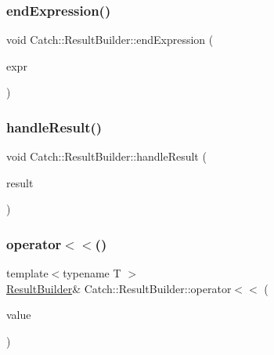 \mbox{\label{class_catch_1_1_result_builder_a864e03b7300271de7cc44b9864463c5a}} 
\subsubsection{\texorpdfstring{end\+Expression()}{endExpression()}}
{\footnotesize\ttfamily void Catch\+::\+Result\+Builder\+::end\+Expression (\begin{DoxyParamCaption}\item[{\mbox{\hyperlink{struct_catch_1_1_decomposed_expression}{Decomposed\+Expression}} const \&}]{expr }\end{DoxyParamCaption})}

\mbox{\label{class_catch_1_1_result_builder_ad8bb17e4ac590b75bf8630d8f3502f4e}} 
\subsubsection{\texorpdfstring{handle\+Result()}{handleResult()}}
{\footnotesize\ttfamily void Catch\+::\+Result\+Builder\+::handle\+Result (\begin{DoxyParamCaption}\item[{\mbox{\hyperlink{class_catch_1_1_assertion_result}{Assertion\+Result}} const \&}]{result }\end{DoxyParamCaption})}

\mbox{\label{class_catch_1_1_result_builder_a5aa79ce6160ab8cd800eb65bbd7a28a4}} 
\subsubsection{\texorpdfstring{operator$<$$<$()}{operator<<()}}
{\footnotesize\ttfamily template$<$typename T $>$ \\
\mbox{\hyperlink{class_catch_1_1_result_builder}{Result\+Builder}}\& Catch\+::\+Result\+Builder\+::operator$<$$<$ (\begin{DoxyParamCaption}\item[{T const \&}]{value }\end{DoxyParamCaption})\hspace{0.3cm}{\ttfamily [inline]}}

